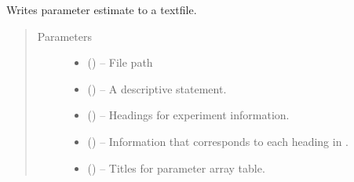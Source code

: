 \documentclass[letterpaper,10pt,english]{sphinxmanual}
\begin{document}
\begin{fulllineitems}
\label{\detokenize{references/write:nmrespy.write._write_txt}}
\sphinxAtStartPar
Writes parameter estimate to a textfile.
\begin{quote}\begin{description}
\item[{Parameters}] \leavevmode\begin{itemize}
\item {} 
\sphinxAtStartPar
{} () – File path

\item {} 
\sphinxAtStartPar
{} (\sphinxstyleliteralemphasis{\sphinxupquote{, }}) – A descriptive statement.

\item {} 
\sphinxAtStartPar
{} (\sphinxstyleliteralemphasis{\sphinxupquote{, }}) – Headings for experiment information.

\item {} 
\sphinxAtStartPar
{} (\sphinxstyleliteralemphasis{\sphinxupquote{, }}) – Information that corresponds to each heading in .

\item {} 
\sphinxAtStartPar
{} () – Titles for parameter array table.


\end{itemize}
\end{description}
\end{quote}
\end{fulllineitems}
\end{document}
